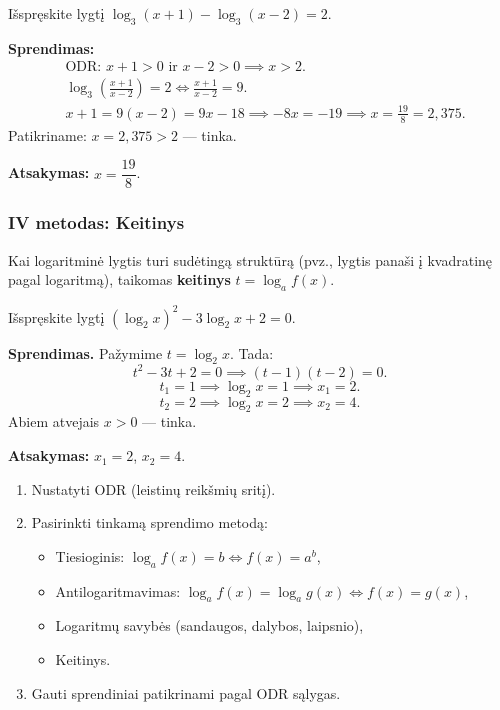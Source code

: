 \begin{example}
Išspręskite lygtį \(\log_3(x+1) - \log_3(x-2) = 2\).

\textbf{Sprendimas:}
\begin{align*}
&\text{ODR: } x + 1 > 0 \text{ ir } x - 2 > 0 \implies x > 2.\\
&\log_3\!\left(\frac{x+1}{x-2}\right) = 2 \iff \frac{x+1}{x-2} = 9.\\
&x + 1 = 9(x-2) = 9x - 18 \implies -8x = -19 \implies x = \frac{19}{8} = 2{,}375.
\end{align*}
Patikriname: \(x = 2{,}375 > 2\) — tinka.

\textbf{Atsakymas:} \(x = \dfrac{19}{8}\).
\end{example}

\subsubsection{IV metodas: Keitinys}

Kai logaritminė lygtis turi sudėtingą struktūrą (pvz., lygtis panaši į kvadratinę pagal logaritmą), taikomas \textbf{keitinys} \(t = \log_a f(x)\).

\begin{example}
Išspręskite lygtį \(\left(\log_2 x\right)^2 - 3\log_2 x + 2 = 0\).

\textbf{Sprendimas.} Pažymime \(t = \log_2 x\). Tada:
\[
t^2 - 3t + 2 = 0 \implies (t-1)(t-2) = 0.
\]
\[
t_1 = 1 \implies \log_2 x = 1 \implies x_1 = 2.
\]
\[
t_2 = 2 \implies \log_2 x = 2 \implies x_2 = 4.
\]
Abiem atvejais \(x > 0\) — tinka.

\textbf{Atsakymas:} \(x_1 = 2\), \(x_2 = 4\).
\end{example}

\begin{tcolorbox}[colback=blue!5, colframe=blue!40, title=\textbf{Logaritminių lygčių sprendimo žingsniai}]
\begin{enumerate}
    \item Nustatyti ODR (leistinų reikšmių sritį).
    \item Pasirinkti tinkamą sprendimo metodą:
    \begin{itemize}
        \item Tiesioginis: \(\log_a f(x) = b \iff f(x) = a^b\),
        \item Antilogaritmavimas: \(\log_a f(x) = \log_a g(x) \iff f(x) = g(x)\),
        \item Logaritmų savybės (sandaugos, dalybos, laipsnio),
        \item Keitinys.
    \end{itemize}
    \item Gauti sprendiniai patikrinami pagal ODR sąlygas.
\end{enumerate}
\end{tcolorbox}

